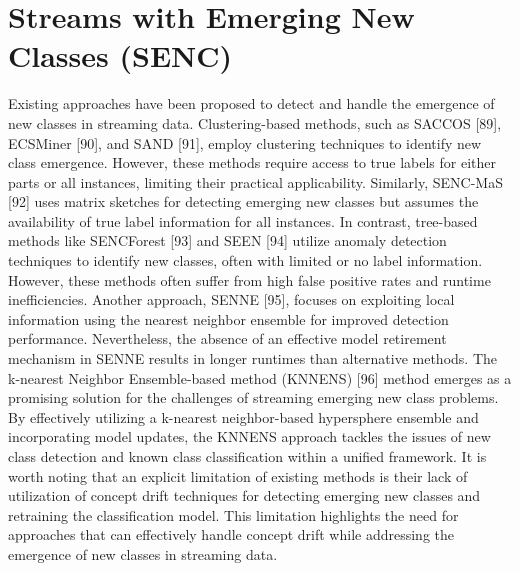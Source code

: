 \section{Streams with Emerging New Classes (SENC)}
\label{sec:3_4_emergence}
Existing approaches have been proposed to detect and handle the emergence of new classes in streaming data. Clustering-based methods, such as SACCOS [89], ECSMiner [90], and SAND [91], employ clustering techniques to identify new class emergence. However, these methods require access to true labels for either parts or all instances, limiting their practical applicability. Similarly, SENC-MaS [92] uses matrix sketches for detecting emerging new classes but assumes the availability of true label information for all instances. In contrast, tree-based methods like SENCForest [93] and SEEN [94] utilize anomaly detection techniques to identify new classes, often with limited or no label information. However, these methods often suffer from high false positive rates and runtime inefficiencies. Another approach, SENNE [95], focuses on exploiting local information using the nearest neighbor ensemble for improved detection performance.  Nevertheless, the absence of an effective model retirement mechanism in SENNE results in longer runtimes than alternative methods. The k-nearest Neighbor Ensemble-based method (KNNENS) [96] method emerges as a promising solution for the challenges of streaming emerging new class problems. By effectively utilizing a k-nearest neighbor-based hypersphere ensemble and incorporating model updates, the KNNENS approach tackles the issues of new class detection and known class classification within a unified framework. It is worth noting that an explicit limitation of existing methods is their lack of utilization of concept drift techniques for detecting emerging new classes and retraining the classification model. This limitation highlights the need for approaches that can effectively handle concept drift while addressing the emergence of new classes in streaming data.
